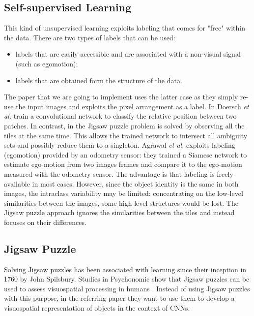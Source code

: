 \subsection{Self-supervised Learning}
This kind of unsupervised learning exploits labeling that comes for "free" within the data. There are two types of labels that can be used:
\begin{itemize}
    \item labels that are easily accessible and are associated with a non-visual signal (such as egomotion);
    \item labels that are obtained form the structure of the data.
\end{itemize}
The paper that we are going to implement uses the latter case as they simply re-use the input images and exploits the pixel arrangement as a label.\newline
In \cite{context_prediction} Doersch \textit{et al.} train a convolutional network to classify the relative position between two patches. In contrast, in \cite{Noroozi_2016} the Jigsaw puzzle problem is solved by observing all the tiles at the same time. This allows the trained network to intersect all ambiguity sets and possibly reduce them to a singleton.
Agrawal \textit{et al.} \cite{learning_by_moving} exploits labeling (egomotion) provided by an odometry sensor: they trained a Siamese network to estimate ego-motion from two images frames and compare it to the ego-motion measured with the odometry sensor. The advantage is that labeling is freely available in most cases. However, since the object identity is the same in both images, the intraclass variability may be limited: concentrating on the low-level similarities between the images, some high-level structures would be lost. The Jigsaw puzzle approach ignores the similarities between the tiles and instead focuses on their differences.

\subsection{Jigsaw Puzzle}
Solving Jigsaw puzzles has been associated with learning since their inception in 1760 by John Spilsbury. Studies in Psychonomic show that Jigsaw puzzles can be used to assess visuospatial processing in humans \cite{assessing_visuospatial_processes}. Instead of using Jigsaw puzzles with this purpose, in the referring paper they want to use them to develop a visuospatial representation of objects in the context of CNNs.
